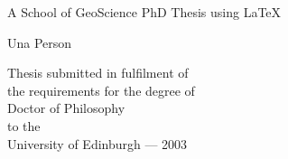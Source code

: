 \thispagestyle{empty}

\begin{minipage}{\textwidth}
\end{minipage}
\begin{center}
\vspace{2cm}
{ \Huge A School of GeoScience PhD Thesis using {\LaTeX}
  \par
  \vspace{0.5cm}
{\Large Una Person \par}
}
\end{center}
\vfill
\begin{center}
\vspace{6cm}
\centerline{}
\vspace{0.5cm}
Thesis submitted in fulfilment of\\
the requirements for the degree of\\
Doctor of Philosophy\\
to the\\
University of Edinburgh --- 2003
\end{center}

\newpage
\thispagestyle{empty}


